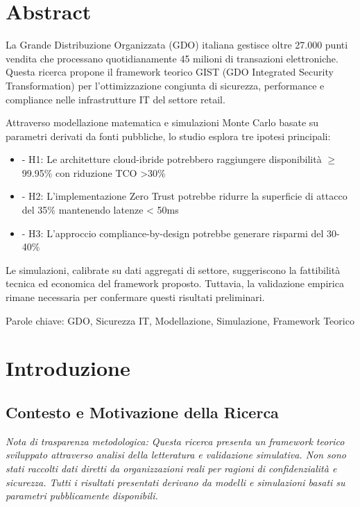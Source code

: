 \documentclass[12pt,a4paper,oneside]{book}
\numberwithin{figure}{chapter} %
\numberwithin{table}{chapter}  %
\begin{document}
\chapter*{Abstract}

La Grande Distribuzione Organizzata (GDO) italiana gestisce oltre 27.000 punti 
vendita che processano quotidianamente 45 milioni di transazioni elettroniche. 
Questa ricerca propone il framework teorico GIST (GDO Integrated Security 
Transformation) per l'ottimizzazione congiunta di sicurezza, performance e 
compliance nelle infrastrutture IT del settore retail.

Attraverso modellazione matematica e simulazioni Monte Carlo basate su parametri 
derivati da fonti pubbliche, lo studio esplora tre ipotesi principali:
\begin{itemize}
    \item 
- H1: Le architetture cloud-ibride potrebbero raggiungere disponibilità $\geq$ 99.95\% 
  con riduzione TCO >30\%
  \item 
- H2: L'implementazione Zero Trust potrebbe ridurre la superficie di attacco 
  del 35\% mantenendo latenze < 50ms
  \item 
- H3: L'approccio compliance-by-design potrebbe generare risparmi del 30-40\%
\end{itemize}

Le simulazioni, calibrate su dati aggregati di settore, suggeriscono la 
fattibilità tecnica ed economica del framework proposto. 
Tuttavia, la 
validazione empirica rimane necessaria per confermare questi risultati 
preliminari.

Parole chiave: GDO, Sicurezza IT, Modellazione, Simulazione, Framework Teorico

\chapter{\texorpdfstring{\textbf{Introduzione}}{Capitolo 1 - Introduzione}}\label{capitolo-1---introduzione}

\section{\texorpdfstring{\textbf{Contesto e Motivazione della
Ricerca}}{1.1 Contesto e Motivazione della Ricerca}}\label{contesto-e-motivazione-della-ricerca}
\textit{Nota di trasparenza metodologica: Questa ricerca presenta un framework 
teorico sviluppato attraverso analisi della letteratura e validazione 
simulativa. Non sono stati raccolti dati diretti da organizzazioni reali 
per ragioni di confidenzialità e sicurezza. Tutti i risultati presentati 
derivano da modelli e simulazioni basati su parametri pubblicamente disponibili.}
\end{document}
